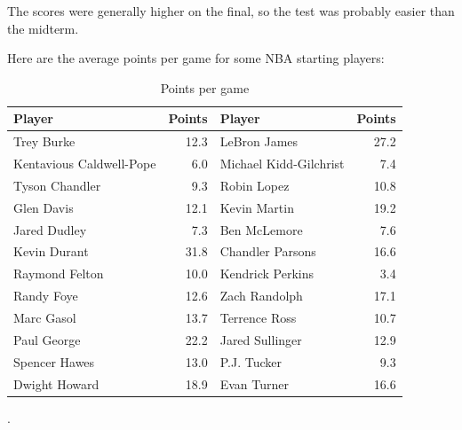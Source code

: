 \documentclass[letterpaper, landscape]{exam}
\begin{document}
\begin{questions}
\begin{parts}
          \begin{solution}
            The scores were generally higher on the final, so the test was
            probably easier than the midterm.
          \end{solution}

      \end{parts}

    \question
      \label{q:point.histogram}
      Here are the average points per game for some NBA starting players:

      \begin{table}[ht]
        \centering
        \begin{tabular}{lr|lr}
          \toprule
          Player                   & Points & Player                 & Points\\
          \midrule
          Trey Burke               & 12.3   & LeBron James           & 27.2 \\
          Kentavious Caldwell-Pope & 6.0    & Michael Kidd-Gilchrist & 7.4 \\
          Tyson Chandler           & 9.3    & Robin Lopez            & 10.8 \\
          Glen Davis               & 12.1   & Kevin Martin           & 19.2 \\
          Jared Dudley             & 7.3    & Ben McLemore           & 7.6 \\
          Kevin Durant             & 31.8   & Chandler Parsons       & 16.6 \\
          Raymond Felton           & 10.0   & Kendrick Perkins       & 3.4 \\
          Randy Foye               & 12.6   & Zach Randolph          & 17.1 \\
          Marc Gasol               & 13.7   & Terrence Ross          & 10.7 \\
          Paul George              & 22.2   & Jared Sullinger        & 12.9 \\
          Spencer Hawes            & 13.0   & P.J. Tucker            & 9.3 \\
          Dwight Howard            & 18.9   & Evan Turner            & 16.6 \\
          \bottomrule
        \end{tabular}
        \caption{Points per game}.
      \end{table}

\end{questions}
\end{document}
